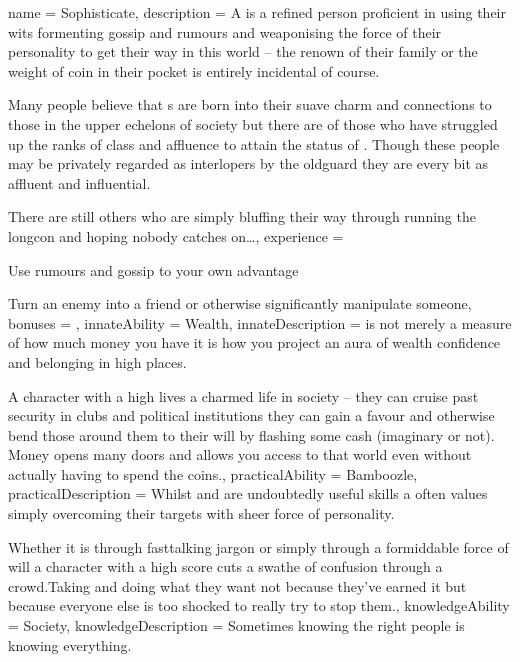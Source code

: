 \archetype
{
	name = Sophisticate,
	description = A \bname{} is a refined person\comma{} proficient in using their wits\comma{} formenting gossip and rumours\comma{} and weaponising the force of their personality to get their way in this world – the renown of their family\comma{} or the weight of coin in their pocket is entirely incidental\comma{} of course. 

Many people believe that \name{}s are born into their suave\comma{} charm and connections to those in the upper echelons of society\comma{} but there are of those who have struggled up the ranks of class and affluence to attain the status of \bname{}. Though these people may be privately regarded as interlopers by the old\minus{}guard\comma{} they are every bit as affluent and influential. 

There are still others who are simply bluffing their way through\comma{} running the long\minus{}con and hoping nobody catches on…,
	experience = \item Use rumours and gossip to your own advantage
\item Turn an enemy into a friend\comma{} or otherwise significantly manipulate someone,
	bonuses = 
,
	innateAbility = Wealth,
	innateDescription =  is not merely a measure of how much money you have\comma{} it is how you project an aura of wealth\comma{} confidence and belonging in high places. 

A character with a high  lives a charmed life in society – they can cruise past security in clubs and political institutions\comma{} they can gain a favour and otherwise bend those around them to their will by flashing some cash (imaginary or not). Money opens many doors\comma{} and  allows you access to that world\comma{} even without actually having to spend the coins.,
	practicalAbility = Bamboozle,
	practicalDescription = Whilst \comma{}  and  are undoubtedly useful skills\comma{} a \bname{} often values simply overcoming their targets with sheer force of personality. 

Whether it is through fast\minus{}talking jargon\comma{} or simply through a formiddable force of will\comma{} a character with a high  score cuts a swathe of confusion through a crowd.Taking and doing what they want not because they’ve earned it\comma{} but because everyone else is too shocked to really try to stop them.,
	knowledgeAbility = Society,
	knowledgeDescription = Sometimes\comma{} knowing the right people is knowing everything. 

}
